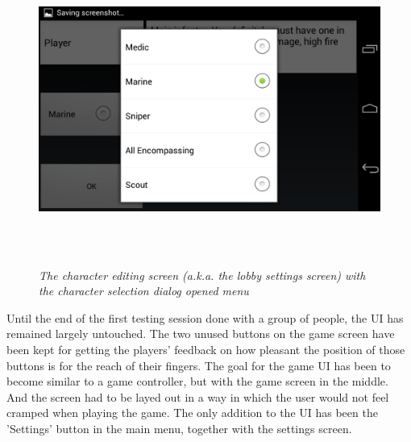 \documentclass{article}
\begin{document}
\begin{figure}
\includegraphics[height=4in,width=7.12in]{./images/android_screenshots/first_development/game_first_development10.png}
\caption{\small \sl The character editing screen (a.k.a. the lobby settings
screen) with the character selection dialog opened
menu\label{fig:lobby_settings_2}}
\end{figure}

Until the end of the first testing session done with a group of people, the UI
has remained largely untouched. The two unused buttons on the game screen have
been kept for getting the players' feedback on how pleasant the position of
those buttons is for the reach of their fingers. The goal for the game UI has
been to become similar to a game controller, but with the game screen in the
middle. And the screen had to be layed out in a way in which the user would not
feel cramped when playing the game. The only addition to the UI has been
the 'Settings' button in the main menu, together with the settings
screen.\newline
\end{document}
